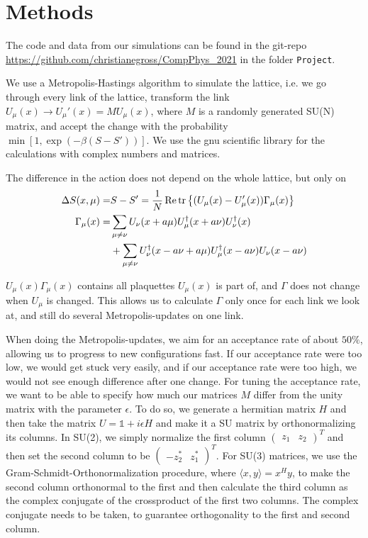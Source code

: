 \documentclass[%
 reprint,
 amsmath,amssymb,
 aps,
]{revtex4-1}
\renewcommand{\Re}{\operatorname{Re}}
\begin{document}
\section{Methods}


The code and data from our simulations can be found in the git-repo \url{https://github.com/christianegross/CompPhys_2021} in the folder \texttt{Project}.

We use a Metropolis-Hastings algorithm to simulate the lattice, i.e. we go through every link of the lattice, transform the link $U_\mu(x)\to U_\mu'(x)=MU_\mu(x)$, where $M$ is a randomly generated SU(N) matrix, and accept the change with the probability $\min[1, \exp(-\beta(S-S'))]$. We use the gnu scientific library for the calculations with complex numbers and matrices.

The difference in the action does not depend on the whole lattice, but only on \begin{align*}
\Delta S(x, \mu)=&S-S'=\frac{1}{N}\Re\tr\left\lbrace (U_\mu(x)-U'_\mu(x))\Gamma_\mu(x)\right\rbrace\\
%
\Gamma_\mu(x)=&\sum_{\mu\neq\nu}U_\nu(x+a\mu)U_\mu^\dagger(x+a\nu)U_\nu^\dagger(x)\\
%
&+\sum_{\mu\neq\nu}U^\dagger_\nu(x-a\nu+a\mu) U^\dagger_\mu(x-a\nu)U_\nu(x-a\nu)
\end{align*}

$U_\mu(x)\Gamma_\mu(x)$ contains all plaquettes $U_\mu(x)$ is part of, and $\Gamma$ does not change when $U_\mu$ is changed. This allows us to calculate $\Gamma$ only once for each link we look at, and still do several Metropolis-updates on one link.

When doing the Metropolis-updates, we aim for an acceptance rate of about $50\%$, allowing us to progress to new configurations fast. If our acceptance rate were too low, we would get stuck very easily, and if our acceptance rate were too high, we would not see enough difference after one change.
For tuning the acceptance rate, we want to be able to specify how much our matrices $M$ differ from the unity matrix with the parameter $\epsilon$. To do so, we generate a hermitian matrix $H$   and then take the matrix $U=\mathbb{1}+i\epsilon H$ and make it a SU matrix by orthonormalizing its columns. In SU(2), we simply normalize the first column $\begin{pmatrix}z_1&z_2\end{pmatrix}^T$ and then set the second column to be $\begin{pmatrix}-z_2^*&z_1^*\end{pmatrix}^T$. For SU(3) matrices, we use the Gram-Schmidt-Orthonormalization procedure, where $\langle x,y\rangle=x^Hy$, to make the second column orthonormal to the first and then calculate the third column as the complex conjugate of the crossproduct of the first two columns. The complex conjugate needs to be taken, to guarantee orthogonality to the first and second column.
\end{document}

